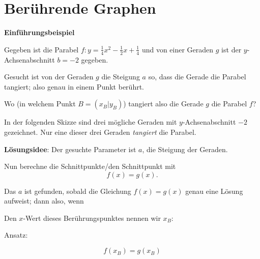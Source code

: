 \section{Berührende Graphen}

\textbf{Einführungsbeispiel}


Gegeben ist die Parabel $f: y=\frac{1}{4}x^2 -\frac12x +\frac14$ und von einer
Geraden $g$ ist der $y$-Achsenabschnitt $b = -2$ gegeben.

Gesucht ist von der Geraden $g$ die Steigung $a$ so, dass die
Gerade die Parabel tangiert; also genau in einem Punkt berührt.

Wo (in welchem Punkt $B=(x_B|y_B)$) tangiert also die Gerade $g$ die Parabel $f$?

In der folgenden Skizze sind drei mögliche Geraden mit $y$-Achsenabschnitt
$-2$ gezeichnet. Nur eine dieser drei Geraden \textit{tangiert} die Parabel.

\newpage
\textbf{Lösungsidee}: Der gesuchte Parameter ist $a$, die Steigung der
Geraden.

Nun berechne die Schnittpunkte/den Schnittpunkt mit $$f(x) = g(x).$$

Das $a$ ist gefunden, sobald die Gleichung $f(x)=g(x)$ genau eine
Lösung aufweist; dann also, wenn



Den $x$-Wert dieses Berührungspunktes nennen wir $x_B$:


Ansatz:

$$f(x_B) = g(x_B)$$


